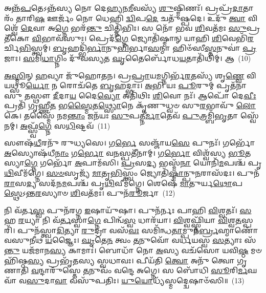 {\anuvakamend[{\-\ul{𑌤𑍃}\-𑌤𑍀𑌯𑍇॑ \ul{𑌤𑍍𑌵𑌾} 𑌗\-\ul{𑌰𑍍𑌭} 𑌆 𑌯᳴\-\ul{𑌵𑌿}\-𑌷𑍍𑌠𑌾 𑌯\-\ul{𑌚𑍍𑌚}\-𑌤𑍍𑌵𑌾𑌰𑌿᳴ 𑌚}]}%

𑌅𑌨𑍍𑌨᳴\-\ul{𑌪}\-𑌤𑍇\-𑌽𑌨𑍍𑌨᳴𑌸𑍍𑌯 𑌨𑍋 𑌦𑍇𑌹𑍍𑌯𑌨\-\ul{𑌮𑍀}\-𑌵𑌸𑍍𑌯᳴ \ul{𑌶𑍁}\-𑌷𑍍𑌮𑌿𑌣𑌃᳴। 𑌪𑍍𑌰𑌪𑍍𑌰᳴\-\ul{𑌦𑌾}\-𑌤𑌾𑌰𑌂᳴ 𑌤𑌾𑌰𑌿\-\ul{𑌷} 𑌊𑌰𑍍𑌜𑌂᳴ 𑌨𑍋 𑌧𑍇𑌹𑌿 \ul{𑌦𑍍𑌵𑌿}\-𑌪\-\ul{𑌦𑍇} 𑌚𑌤𑍁᳴𑌷𑍍𑌪𑌦𑍇। 𑌉𑌦𑍁᳴ \ul{𑌤𑍍𑌵𑌾} 𑌵𑌿𑌶𑍍𑌵𑍇᳴ \ul{𑌦𑍇}\-𑌵𑌾 𑌅\-\ul{𑌗𑍍𑌨𑍇} 𑌭𑌰᳴\-\ul{𑌨𑍍𑌤𑍁} 𑌚𑌿𑌤𑍍𑌤𑌿᳴𑌭𑌿𑌃। 𑌸 𑌨𑍋᳴ 𑌭𑌵 \ul{𑌶𑌿}\-𑌵𑌤᳴𑌮𑌃 \ul{𑌸𑍁}\-𑌪𑍍𑌰𑌤𑍀᳴𑌕𑍋 \ul{𑌵𑌿}\-𑌭𑌾𑌵᳴𑌸𑍁𑌃। 𑌪𑍍𑌰𑍇𑌦᳴\-\ul{𑌗𑍍𑌨𑍇} 𑌜𑍍𑌯𑍋𑌤𑌿᳴𑌷𑍍𑌮𑌾𑌨𑍍 𑌯𑌾𑌹𑌿 \ul{𑌶𑌿}\-𑌵𑍇𑌭𑌿᳴\-\ul{𑌰}\-𑌰𑍍𑌚𑌿\-\ul{𑌭𑌿}\-𑌸𑍍𑌤𑍍𑌵𑌮𑍍। \ul{𑌬𑍃}\-𑌹𑌦𑍍𑌭𑌿᳴\-\ul{𑌰𑍍𑌭𑌾}\-𑌨𑍁\-\ul{𑌭𑌿}\-𑌰𑍍𑌭𑌾\-\ul{𑌸}\-𑌨𑍍𑌮𑌾 𑌹𑌿𑍞᳴𑌸𑍀\-\ul{𑌸𑍍𑌤}\-𑌨𑍁𑌵𑌾॑ \ul{𑌪𑍍𑌰}\-𑌜𑌾𑌃। \ul{𑌸}\-𑌮𑌿\-\ul{𑌧𑌾}\-𑌗𑍍𑌨𑌿𑌂 𑌦𑍁᳴𑌵𑌸𑍍𑌯𑌤 \ul{𑌘𑍃}\-𑌤𑍈𑌰𑍍𑌬𑍋᳴𑌧\-\ul{𑌯}\-𑌤𑌾𑌤𑌿᳴𑌥𑌿𑌮𑍍। 𑌆~(10)

\-\ul{𑌅}\-\-\ul{𑌸𑍍𑌮𑌿}\-𑌨𑍍 \ul{𑌹}\-𑌵𑍍𑌯𑌾 𑌜𑍁᳴𑌹𑍋𑌤𑌨। 𑌪𑍍𑌰\-\ul{𑌪𑍍𑌰𑌾}\-𑌯\-\ul{𑌮}\-𑌗𑍍𑌨𑌿𑌰𑍍𑌭᳴\-\ul{𑌰}\-𑌤𑌸𑍍𑌯᳴ 𑌶𑍃\-\ul{𑌣𑍍𑌵𑍇} 𑌵𑌿 𑌯𑌥𑍍𑌸𑍂\-\ul{𑌰𑍍𑌯𑍋} 𑌨 𑌰𑍋𑌚᳴𑌤𑍇 \ul{𑌬𑍃}\-𑌹𑌦𑍍𑌭𑌾𑌃। \ul{𑌅}\-𑌭𑌿 𑌯𑌃 \ul{𑌪𑍂}\-𑌰𑍁𑌮𑍍 𑌪𑍃𑌤᳴𑌨𑌾𑌸𑍁 \ul{𑌤}\-𑌸𑍍𑌥𑍗 \ul{𑌦𑍀}\-𑌦𑌾\-\ul{𑌯} 𑌦𑍈\-\ul{𑌵𑍍𑌯𑍋} 𑌅𑌤𑌿᳴𑌥𑌿𑌃 \ul{𑌶𑌿}\-𑌵𑍋 𑌨𑌃᳴। 𑌆𑌪𑍋᳴ 𑌦𑍇\-\ul{𑌵𑍀𑌃} 𑌪𑍍𑌰𑌤𑌿᳴ 𑌗𑍃𑌹𑍍𑌣𑍀\-\ul{𑌤} 𑌭\-\ul{𑌸𑍍𑌮𑍈}\-𑌤\-\ul{𑌥𑍍𑌸𑍍𑌯𑍋}\-𑌨𑍇 𑌕𑍃᳴𑌣𑍁𑌧𑍍𑌵𑍞 𑌸𑍁\-\ul{𑌰}\-𑌭𑌾𑌵𑍁᳴ \ul{𑌲𑍋}\-𑌕𑍇। 𑌤𑌸𑍍𑌮𑍈᳴ 𑌨𑌮\-\ul{𑌨𑍍𑌤𑌾𑌂} 𑌜𑌨᳴𑌯𑌃 \ul{𑌸𑍁}\-𑌪𑌤𑍍𑌨𑍀॑\-\ul{𑌰𑍍𑌮𑌾}\-𑌤𑍇𑌵᳴ \ul{𑌪𑍁}\-𑌤𑍍𑌰𑌮𑍍𑌬𑌿᳴\-\ul{𑌭𑍃}\-𑌤𑌾 𑌸𑍍𑌵𑍇᳴𑌨𑌮𑍍। \ul{𑌅}\-𑌫𑍍𑌸𑍍𑌵᳴\-\ul{𑌗𑍍𑌨𑍇} 𑌸\-\ul{𑌧𑌿}\-𑌷𑍍𑌟𑌵᳴~(11)

𑌸𑍗𑌷᳴\-\ul{𑌧𑍀}\-𑌰𑌨𑍁᳴ 𑌰𑍁𑌧𑍍𑌯𑌸𑍇। 𑌗\-\ul{𑌰𑍍𑌭𑍇} 𑌸𑌞𑍍𑌜𑌾᳴𑌯\-\ul{𑌸𑍇} 𑌪𑍁𑌨𑌃᳴। 𑌗𑌰𑍍𑌭𑍋᳴ \ul{𑌅}\-𑌸𑍍𑌯𑍋𑌷᳴𑌧𑍀\-\ul{𑌨𑌾𑌂} 𑌗\-\ul{𑌰𑍍𑌭𑍋} 𑌵\-\ul{𑌨}\-𑌸𑍍𑌪𑌤𑍀᳴𑌨𑌾𑌮𑍍। 𑌗\-\ul{𑌰𑍍𑌭𑍋} 𑌵𑌿𑌶𑍍𑌵᳴𑌸𑍍𑌯 \ul{𑌭𑍂}\-𑌤𑌸𑍍𑌯𑌾\-\ul{𑌗𑍍𑌨𑍇} 𑌗𑌰𑍍𑌭𑍋᳴ \ul{𑌅}\-𑌪𑌾𑌮᳴𑌸𑌿। \ul{𑌪𑍍𑌰}\-𑌸\-\ul{𑌦𑍍𑌯} 𑌭𑌸𑍍𑌮᳴\-\ul{𑌨𑌾} 𑌯𑍋𑌨𑌿᳴\-\ul{𑌮}\-𑌪𑌶𑍍𑌚᳴ 𑌪𑍃\-\ul{𑌥𑌿}\-𑌵𑍀𑌮᳴𑌗𑍍𑌨𑍇। \ul{𑌸}\-\-\ul{𑍞}\-𑌸𑍃𑌜𑍍𑌯᳴ \ul{𑌮𑌾}\-𑌤𑍃\-\ul{𑌭𑌿}\-𑌸𑍍𑌤𑍍𑌵𑌂 𑌜𑍍𑌯𑍋𑌤𑌿᳴\-\ul{𑌷𑍍𑌮𑌾}\-𑌨𑍍𑌪𑍁\-\ul{𑌨}\-𑌰𑌾𑌸᳴𑌦𑌃। 𑌪𑍁𑌨᳴\-\ul{𑌰𑌾}\-𑌸\-\ul{𑌦𑍍𑌯} 𑌸𑌦᳴𑌨\-\ul{𑌮}\-𑌪𑌶𑍍𑌚᳴ 𑌪𑍃\-\ul{𑌥𑌿}\-𑌵𑍀𑌮᳴𑌗𑍍𑌨𑍇। 𑌶𑍇𑌷𑍇᳴ \ul{𑌮𑌾}\-𑌤𑍁𑌰𑍍𑌯\-\ul{𑌥𑍋}\-𑌪\-\ul{𑌸𑍍𑌥𑍇}\-\-𑌽𑌨𑍍𑌤\-\ul{𑌰}\-𑌸𑍍𑌯𑌾𑍞 \ul{𑌶𑌿}\-𑌵𑌤᳴𑌮𑌃। 𑌪𑍁𑌨᳴\-\ul{𑌰𑍂}\-𑌰𑍍𑌜𑌾~(12)

𑌨𑌿 𑌵᳴𑌰𑍍𑌤\-\ul{𑌸𑍍𑌵} 𑌪𑍁𑌨᳴𑌰𑌗𑍍𑌨 \ul{𑌇}\-𑌷𑌾𑌯𑍁᳴𑌷𑌾। 𑌪𑍁𑌨᳴𑌰𑍍𑌨𑌃 𑌪𑌾𑌹𑌿 \ul{𑌵𑌿}\-𑌶𑍍𑌵𑌤𑌃᳴। \ul{𑌸}\-𑌹 \ul{𑌰}\-𑌯𑍍𑌯𑌾 𑌨𑌿 𑌵᳴\-\ul{𑌰𑍍𑌤}\-𑌸𑍍𑌵𑌾\-\ul{𑌗𑍍𑌨𑍇} 𑌪𑌿𑌨𑍍𑌵᳴\-\ul{𑌸𑍍𑌵} 𑌧𑌾𑌰᳴𑌯𑌾। \ul{𑌵𑌿}\-𑌶𑍍𑌵𑌫𑍍𑌸𑍍𑌨𑌿᳴𑌯𑌾 \ul{𑌵𑌿}\-𑌶𑍍𑌵\-\ul{𑌤}\-𑌸𑍍𑌪𑌰𑌿᳴। 𑌪𑍁𑌨᳴𑌸𑍍𑌤𑍍𑌵𑌾\-\ul{𑌦𑌿}\-𑌤𑍍𑌯𑌾 \ul{𑌰𑍁}\-𑌦𑍍𑌰𑌾 𑌵𑌸᳴\-\ul{𑌵𑌃} 𑌸𑌮𑌿᳴𑌨𑍍𑌧\-\ul{𑌤𑌾}\-𑌮𑍍𑌪𑍁𑌨᳴\-\ul{𑌰𑍍𑌬𑍍𑌰}\-𑌹𑍍𑌮𑌾𑌣𑍋᳴ 𑌵𑌸𑍁𑌨𑍀𑌥 \ul{𑌯}\-𑌜𑍍𑌞𑍈𑌃। \ul{𑌘𑍃}\-𑌤𑍇\-\ul{𑌨} 𑌤𑍍𑌵𑌂 \ul{𑌤}\-𑌨𑍁𑌵𑍋᳴ 𑌵𑌰𑍍𑌧𑌯𑌸𑍍𑌵 \ul{𑌸}\-𑌤𑍍𑌯𑌾𑌃 𑌸᳴\-\ul{𑌨𑍍𑌤𑍁} 𑌯𑌜᳴𑌮𑌾𑌨\-\ul{𑌸𑍍𑌯} 𑌕𑌾𑌮𑌾𑌃॑। 𑌬𑍋𑌧𑌾᳴ 𑌨𑍋 \ul{𑌅}\-𑌸𑍍𑌯 𑌵𑌚᳴𑌸𑍋 𑌯𑌵𑌿\-\ul{𑌷𑍍𑌠} 𑌮𑍞𑌹𑌿᳴𑌷𑍍𑌠\-\ul{𑌸𑍍𑌯} 𑌪𑍍𑌰𑌭𑍃᳴𑌤𑌸𑍍𑌯 𑌸𑍍𑌵𑌧𑌾𑌵𑌃। 𑌪𑍀𑌯᳴𑌤𑌿 \ul{𑌤𑍍𑌵𑍋} 𑌅𑌨𑍁᳴ 𑌤𑍍𑌵𑍋 𑌗𑍃𑌣𑌾𑌤𑌿 \ul{𑌵}\-𑌨𑍍𑌦𑌾𑌰𑍁᳴𑌸𑍍𑌤𑍇 \ul{𑌤}\-𑌨𑍁𑌵𑌂᳴ 𑌵𑌨𑍍𑌦𑍇 𑌅𑌗𑍍𑌨𑍇। 𑌸 𑌬𑍋᳴𑌧𑌿 \ul{𑌸𑍂}\-𑌰𑌿\-\ul{𑌰𑍍𑌮}\-𑌘𑌵𑌾᳴ 𑌵\-\ul{𑌸𑍁}\-𑌦𑌾\-\ul{𑌵𑌾} 𑌵𑌸𑍁᳴𑌪𑌤𑌿𑌃। \ul{𑌯𑍁}\-\-\ul{𑌯𑍋}\-𑌧𑍍𑌯᳴𑌸𑍍𑌮𑌦𑍍𑌦𑍍𑌵𑍇𑌷𑌾𑍞᳴𑌸𑌿॥~(13)


